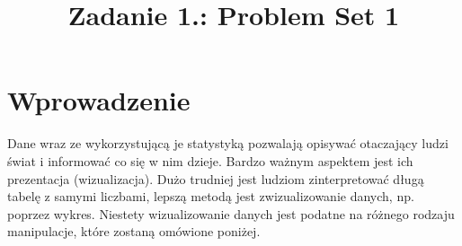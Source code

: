 \documentclass{classrep}
\author{%
    \studentinfo[239661@edu.p.lodz.pl]{Szymon Gruda}{239661}
}
\title{Zadanie 1.: Problem Set 1}
\begin{document}
    \maketitle
    \thispagestyle{fancyplain}

    \section{Wprowadzenie} {
        Dane wraz ze wykorzystującą je statystyką pozwalają opisywać otaczający ludzi świat i informować co się w nim dzieje.
         Bardzo ważnym aspektem jest ich prezentacja (wizualizacja). Dużo trudniej jest ludziom zinterpretować długą tabelę 
         z samymi liczbami, lepszą metodą jest zwizualizowanie danych, np. poprzez wykres. Niestety wizualizowanie danych
          jest podatne na różnego rodzaju manipulacje, które zostaną omówione poniżej.
    }
\end{document}
